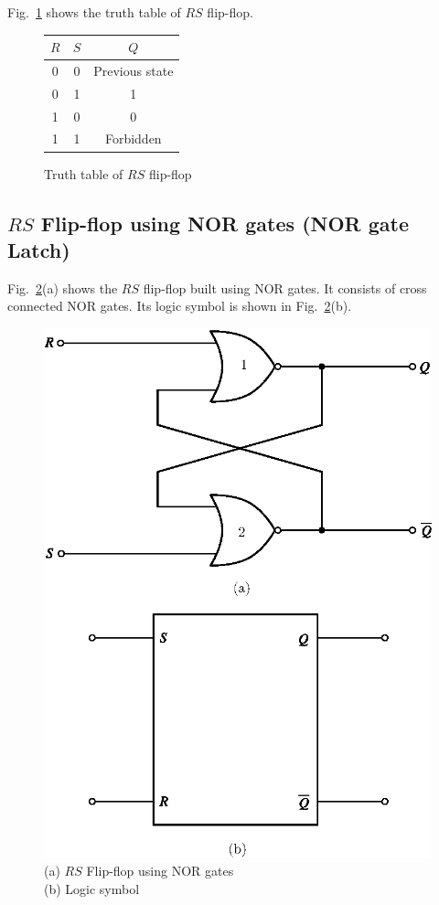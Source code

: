 \eject

Fig.~\ref{fig6.38} shows the truth table of $RS$ flip-flop.
\begin{figure}[H]
\centering
\tabcolsep=15pt
\begin{tabular}{|c|c|c|}
\hline
\boldmath$R$ & \boldmath$S$ & \boldmath$Q$\\
\hline
0 & 0 & Previous state\\
0 & 1 & 1\\
1 & 0 & 0\\
1 & 1 & Forbidden\\
\hline
\end{tabular}
\caption{Truth table of $RS$ flip-flop}\label{fig6.38}
\end{figure}

\subsection{$RS$ Flip-flop using NOR gates (NOR gate Latch)}

Fig.~\ref{fig6.39}(a) shows the $RS$ flip-flop built using NOR gates. It consists of cross connected NOR gates. Its logic symbol is shown in Fig.~\ref{fig6.39}(b).
\begin{figure}[H]
\centering
\includegraphics[scale=.8]{chap6/fig139.eps}
\caption{(a) $RS$ Flip-flop using NOR gates\\ (b) Logic symbol\qquad\quad~}\label{fig6.39}
\end{figure}

